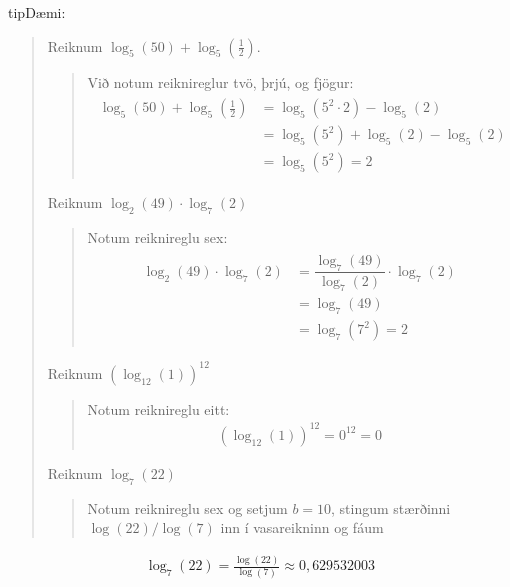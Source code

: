 \documentclass[a4paper,10pt,icelandic]{sphinxmanual}
\begin{document}
\begin{sphinxadmonition}{tip}{Dæmi:}\begin{quote}

 Reiknum \(\log_5(50)+\log_5(\frac{1}{2})\).
\begin{quote}

Við notum reiknireglur tvö, þrjú, og fjögur:
\begin{equation*}
\begin{split}\begin{aligned}\log_5(50)+\log_5(\frac{1}{2})&=\log_5(5^2\cdot 2)-\log_5(2)\\&=\log_5(5^2)+\log_5(2)-\log_5(2)\\&=\log_5(5^2)=2\end{aligned}\end{split}
\end{equation*}\end{quote}

 Reiknum \(\log_2(49)\cdot \log_7(2)\)
\begin{quote}

Notum reiknireglu sex:
\begin{equation*}
\begin{split}\begin{aligned}
               \log_2(49)\cdot \log_7(2)&=\dfrac{\log_7(49)}{\log_7(2)}\cdot \log_7(2)\\
               &=\log_7(49)\\
               &=\log_7(7^2)=2
       \end{aligned}\end{split}
\end{equation*}\end{quote}

 Reiknum \((\log_{12}(1))^{12}\)
\begin{quote}

Notum reiknireglu eitt:
\begin{equation*}
\begin{split}(\log_{12}(1))^{12}=0^{12}=0\end{split}
\end{equation*}\end{quote}

 Reiknum \(\log_7(22)\)
\begin{quote}

Notum reiknireglu sex og setjum \(b=10\), stingum stærðinni \(\log(22)/\log(7)\) inn í vasareikninn og fáum
\end{quote}
\end{quote}
\begin{equation*}
\begin{split}\log_7(22)=\frac{\log(22)}{\log(7)}\approx 0,629532003\end{split}
\end{equation*}\end{sphinxadmonition}
\end{document}

